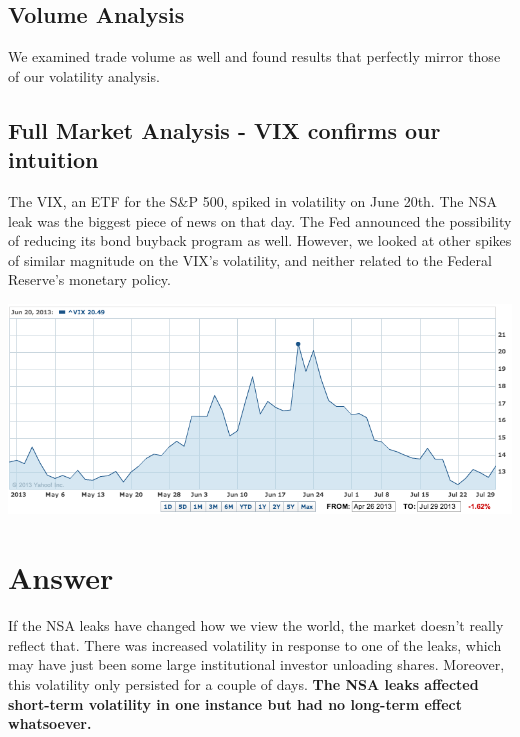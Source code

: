 \documentclass[10pt]{amsart}
\begin{document}
\subsection{Volume Analysis}
We examined trade volume as well and found results that perfectly mirror those of our volatility analysis.

\subsection{Full Market Analysis - VIX confirms our intuition}
The VIX, an ETF for the S\&P 500, spiked in volatility on June 20th. The NSA leak was the biggest piece of news on that day. The Fed announced the possibility of reducing its bond buyback program as well. However, we looked at other spikes of similar magnitude on the VIX's volatility, and neither related to the Federal Reserve's monetary policy. \\

\centerline{\includegraphics[scale=0.5]{vix_june_20.png}}

\section{Answer}
If the NSA leaks have changed how we view the world, the market doesn't really reflect that. There was increased volatility in response to one of the leaks, which may have just been some large institutional investor unloading shares. Moreover, this volatility only persisted for a couple of days. \textbf{The NSA leaks affected short-term volatility in one instance but had no long-term effect whatsoever.}
\end{document}
